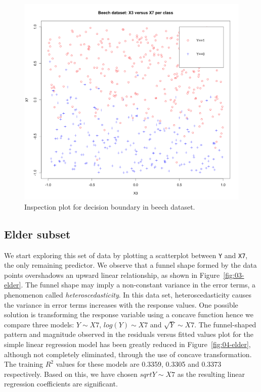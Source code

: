 \documentclass{article}
\begin{document}
\begin{figure}[h!]
  \includegraphics[width=\linewidth]{project/images/02-beech.png}
  \caption{Inspection plot for decision boundary in beech dataset.}
  \label{fig:01-beech}
\end{figure}

\subsection{Elder subset}

We start exploring this set of data by plotting a scatterplot between {\tt Y} and {\tt X7}, the only remaining predictor. We observe that a funnel shape formed by the data points overshadows an upward linear relationship, as shown in Figure~\ref{fig:03-elder}. The funnel shape may imply a non-constant variance in the error terms, a phenomenon called {\em heteroscedasticity}. In this data set, heteroscedasticity causes the variance in error terms increases with the response values. One possible solution is transforming the response variable using a concave function hence we compare three models: $Y \sim X7$, $log(Y) \sim X7$ and $\sqrt{Y} \sim X7$. The funnel-shaped pattern and magnitude observed in the residuals versus fitted values plot for the simple linear regression model has been greatly reduced in Figure~\ref{fig:04-elder}, although not completely eliminated, through the use of concave transformation. The training $R^2$ values for these models are 0.3359, 0.3305 and 0.3373 respectively. Based on this, we have chosen $sqrt{Y} \sim X7$ as the resulting linear regression coefficients are significant.
\end{document}
